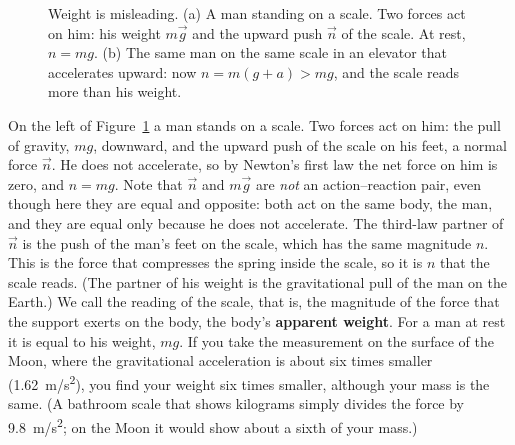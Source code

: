 \documentclass[11pt,a4paper]{article}
\begin{document}
\begin{figure}[ht]
\centering
{}
\caption{Weight is misleading. (a) A man standing on a scale. Two forces act on him: his weight
$m\vec{g}$ and the upward push $\vec{n}$ of the scale. At rest, $n = mg$. (b) The same man on the
same scale in an elevator that accelerates upward: now $n = m(g+a) > mg$, and the scale reads more
than his weight.}\label{fig:scale}
\end{figure}

On the left of Figure~\ref{fig:scale} a man stands on a scale. Two forces act on him: the pull of
gravity, $mg$, downward, and the upward push of the scale on his feet, a normal force $\vec{n}$.
He does not accelerate, so by Newton's first law the net force on him is zero, and $n = mg$. Note
that $\vec{n}$ and $m\vec{g}$ are \emph{not} an action--reaction pair, even though here they are
equal and opposite: both act on the same body, the man, and they are equal only because he does
not accelerate. The third-law partner of $\vec{n}$ is the push of the man's feet on the scale, which
has the same magnitude $n$. This is the force that compresses the spring inside the scale, so it is
$n$ that the scale reads. (The partner of his weight is the gravitational pull of the man on the
Earth.) We call the reading of the scale, that is, the magnitude of the force that the support
exerts on the body, the body's \textbf{apparent weight}. For a man at rest it is equal to his
weight, $mg$. If you take the measurement on the surface of the Moon, where the gravitational
acceleration is about six times smaller (\qty{1.62}{m/s^2}), you find your weight six times smaller,
although your mass is the same. (A bathroom scale that shows kilograms simply divides the force by
\qty{9.8}{m/s^2}; on the Moon it would show about a sixth of your mass.)
\end{document}
